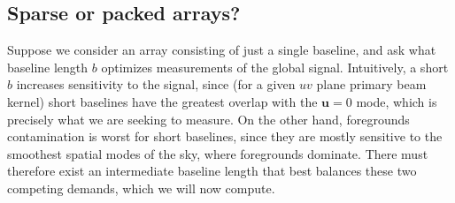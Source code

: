 \documentclass[twolcolumn,apj,iop,numberedappendix]{emulateapj}
\begin{document}
\subsection{Sparse or packed arrays?}

Suppose we consider an array consisting of just a single baseline, and ask what baseline length $b$ optimizes measurements of the global signal.  Intuitively, a short $b$ increases sensitivity to the signal, since (for a given $uv$ plane primary beam kernel) short baselines have the greatest overlap with the $\mathbf{u}=0$ mode, which is precisely what we are seeking to measure.  On the other hand, foregrounds contamination is worst for short baselines, since they are mostly sensitive to the smoothest spatial modes of the sky, where foregrounds dominate.  There must therefore exist an intermediate baseline length that best balances these two competing demands, which we will now compute.
\end{document}
